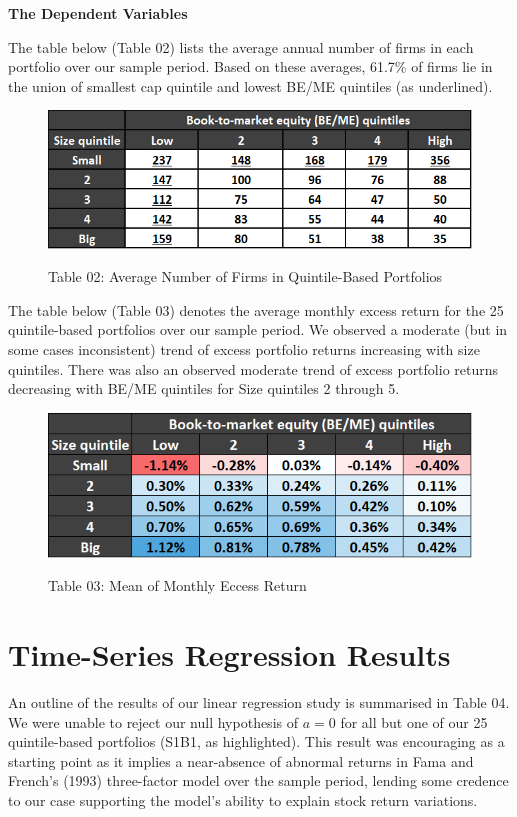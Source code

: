 \documentclass[12pt]{article}
\begin{document}
\noindent \textbf{The Dependent Variables}   

\noindent The table below (Table 02) lists the average annual number of firms in each portfolio over our sample period. Based on these averages, 61.7\% of firms lie in the union of smallest cap quintile and lowest BE/ME quintiles (as underlined).

\begin{figure}[h]
	\centering
	\caption*{Table 02: Average Number of Firms in Quintile-Based Portfolios}
	\includegraphics[width=0.5\linewidth]{A3.png}
	\label{fig:label}
\end{figure}

\noindent The table below (Table 03) denotes the average monthly excess return for the 25 quintile-based portfolios over our sample period. We observed a moderate (but in some cases inconsistent) trend of excess portfolio returns increasing with size quintiles. There was also an observed moderate trend of excess portfolio returns decreasing with BE/ME quintiles for Size quintiles 2 through 5.

\begin{figure}[h]
	\centering
	\caption*{Table 03: Mean of Monthly Eccess Return}
	\includegraphics[width=0.48\linewidth]{A4.png}
	\label{fig:label}
\end{figure}

\section{Time-Series Regression Results}

\noindent An outline of the results of our linear regression study is summarised in Table 04. We were unable to reject our null hypothesis of $a=0$ for all but one of our 25 quintile-based portfolios (S1B1, as highlighted). This result was encouraging as a starting point as it implies a near-absence of abnormal returns in Fama and French's (1993) three-factor model over the sample period, lending some credence to our case supporting the model's ability to explain stock return variations. 
\end{document}
